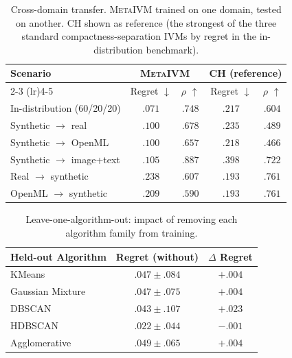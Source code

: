 \documentclass[10pt]{article} %
\newcommand{\ours}{\textsc{MetaIVM}}
\begin{document}
\begin{table}[h]
\centering
\caption{Cross-domain transfer. \ours{} trained on one domain, tested on another. CH shown as reference (the strongest of the three standard compactness-separation IVMs by regret in the in-distribution benchmark).}
\label{tab:transfer}
\small
\begin{tabular}{lcccc}
\toprule
\textbf{Scenario} & \multicolumn{2}{c}{\textbf{\ours{}}} & \multicolumn{2}{c}{\textbf{CH (reference)}} \\
\cmidrule(lr){2-3} \cmidrule(lr){4-5}
& Regret $\downarrow$ & $\rho$ $\uparrow$ & Regret $\downarrow$ & $\rho$ $\uparrow$ \\
\midrule
In-distribution (60/20/20) & $.071$ & $.748$ & $.217$ & $.604$ \\
\midrule
Synthetic $\to$ real & $.100$ & $.678$ & $.235$ & $.489$ \\
Synthetic $\to$ OpenML & $.100$ & $.657$ & $.218$ & $.466$ \\
Synthetic $\to$ image+text & $.105$ & $.887$ & $.398$ & $.722$ \\
\midrule
Real $\to$ synthetic & $.238$ & $.607$ & $.193$ & $.761$ \\
OpenML $\to$ synthetic & $.209$ & $.590$ & $.193$ & $.761$ \\
\bottomrule
\end{tabular}
\end{table}

\begin{table}[h]
\centering
\caption{Leave-one-algorithm-out: impact of removing each algorithm family from training.}
\label{tab:loo}
\small
\begin{tabular}{lcc}
\toprule
\textbf{Held-out Algorithm} & \textbf{Regret (without)} & $\Delta$ \textbf{Regret} \\
\midrule
KMeans & $.047 \pm .084$ & $+.004$ \\
Gaussian Mixture & $.047 \pm .075$ & $+.004$ \\
DBSCAN & $.043 \pm .107$ & $+.023$ \\
HDBSCAN & $.022 \pm .044$ & $-.001$ \\
Agglomerative & $.049 \pm .065$ & $+.004$ \\
\bottomrule
\end{tabular}
\end{table}
\end{document}
